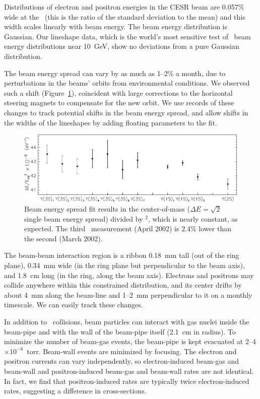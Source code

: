 \documentclass{cornell}
\begin{document}
Distributions of electron and positron energies in the CESR beam are
0.057\% wide at the \us\ (this is the ratio of the standard deviation
to the mean) and this width scales linearly with beam energy.  The
beam energy distribution is Gaussian.  Our lineshape data, which is
the world's most sensitive test of \ee\ beam energy distributions near
10~GeV, show no deviations from a pure Gaussian distribution.

The beam energy spread can vary by as much as 1--2\% a month, due to
perturbations in the beams' orbits from environmental conditions.  We
observed such a shift (Figure~\ref{beamenergyspread}), coincident with
large corrections to the horizontal steering magnets to compensate for
the new orbit.  We use records of these changes to track potential
shifts in the beam energy spread, and allow shifts in the widths of
the lineshapes by adding floating parameters to the
fit. \label{pag:beamenergyspread}

\begin{figure}[p]
  \begin{center}
    \includegraphics[width=\linewidth]{newplots/beamenergyspread}
  \end{center}
  \caption[Beam energy spread as a function of
  date]{\label{beamenergyspread} Beam energy spread fit results in the
  center-of-mass ($\Delta E = \sqrt{2}$ single beam energy spread)
  divided by \ecm$^2$, which is nearly constant, as expected.  The
  third \us\ measurement (April 2002) is 2.4\% lower than the second
  (March 2002).}
\end{figure}

The beam-beam interaction region is a ribbon 0.18~mm tall (out of the
ring plane), 0.34~mm wide (in the ring plane but perpendicular to the
beam axis), and 1.8~cm long (in the ring, along the beam axis).
Electrons and positrons may collide anywhere within this constrained
distribution, and its center drifts by about 4~mm along the beam-line
and 1--2~mm perpendicular to it on a monthly timescale.  We can easily
track these changes.

In addition to \ee\ collisions, beam particles can interact with gas
nuclei inside the beam-pipe and with the wall of the beam-pipe itself
(2.1~cm in radius).  To minimize the number of beam-gas events, the
beam-pipe is kept evacuated at 2--4$\times 10^{-8}$~torr.  Beam-wall
events are minimized by focusing.  The electron and positron currents
can vary independently, so electron-induced beam-gas and beam-wall and
positron-induced beam-gas and beam-wall rates are not identical.  In
fact, we find that positron-induced rates are typically twice
electron-induced rates, suggesting a difference in cross-sections.
\end{document}

